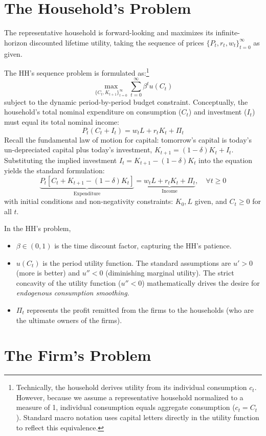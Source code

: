 \section{The Household's Problem}

The representative household is forward-looking and maximizes its infinite-horizon discounted lifetime utility, taking the sequence of prices $\{P_t, r_t, w_t\}_{t=0}^\infty$ as given.

The HH's sequence problem is formulated as:\footnote{Technically, the household derives utility from its individual consumption $c_t$. However, because we assume a representative household normalized to a measure of 1, individual consumption equals aggregate consumption ($c_t = C_t$). Standard macro notation uses capital letters directly in the utility function to reflect this equivalence.}
$$
\max_{\{C_t, K_{t+1}\}_{t=0}^\infty} \sum_{t=0}^\infty \beta^t u(C_t)
$$
subject to the dynamic period-by-period budget constraint. Conceptually, the household's total nominal expenditure on consumption ($C_t$) and investment ($I_t$) must equal its total nominal income:
$$
P_t (C_t + I_t) = w_t L + r_t K_t + \Pi_t
$$
Recall the fundamental law of motion for capital: tomorrow's capital is today's un-depreciated capital plus today's investment, $K_{t+1} = (1-\delta)K_t + I_t$. Substituting the implied investment $I_t = K_{t+1} - (1-\delta)K_t$ into the equation yields the standard formulation:
$$
\underbrace{P_t \left[ C_t + K_{t+1} - (1-\delta)K_t \right]}_{\text{Expenditure}} = \underbrace{w_t L + r_t K_t + \Pi_t}_{\text{Income}}, \quad \forall t \ge 0
$$
with initial conditions and non-negativity constraints: $K_0, L$ given, and $C_t \ge 0$ for all $t$.

In the HH's problem,
\begin{itemize}
    \item $\beta \in (0,1)$ is the time discount factor, capturing the HH's patience.
    \item $u(C_t)$ is the period utility function. The standard assumptions are $u' > 0$ (more is better) and $u'' < 0$ (diminishing marginal utility). The strict concavity of the utility function ($u'' < 0$) mathematically drives the desire for \textit{endogenous consumption smoothing}.
    \item $\Pi_t$ represents the profit remitted from the firms to the households (who are the ultimate owners of the firms).
\end{itemize}

\section{The Firm's Problem}

